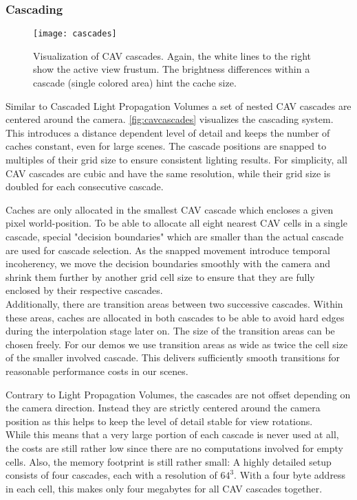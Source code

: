 \documentclass[thesis.tex]{subfiles}
\begin{document}
\subsubsection{Cascading} \label{sec:impl:cavcascading}
\begin{figure}[h]
	\centering
	\texttt{[image: cascades]}
	\caption{Visualization of CAV cascades. Again, the white lines to the right show the active view frustum. The brightness differences within a cascade (single colored area) hint the cache size.} \label{fig:cavcascades}
\end{figure}
Similar to Cascaded Light Propagation Volumes \cite{bib:lpt} a set of nested CAV cascades are centered around the camera.
\autoref{fig:cavcascades} visualizes the cascading system.
This introduces a distance dependent level of detail and keeps the number of caches constant, even for large scenes.
The cascade positions are snapped to multiples of their grid size to ensure consistent lighting results. %
For simplicity, all CAV cascades are cubic and have the same resolution, while their grid size is doubled for each consecutive cascade.

Caches are only allocated in the smallest CAV cascade which encloses a given pixel world-position.
To be able to allocate all eight nearest CAV cells in a single cascade, special "decision boundaries" which are smaller than the actual cascade are used for cascade selection.
As the snapped movement introduce temporal incoherency, we move the decision boundaries smoothly with the camera and shrink them further by another grid cell size to ensure that they are fully enclosed by their respective cascades.
\\
Additionally, there are transition areas between two successive cascades.
Within these areas, caches are allocated in both cascades to be able to avoid hard edges during the interpolation stage later on.
The size of the transition areas can be chosen freely.
For our demos we use transition areas as wide as twice the cell size of the smaller involved cascade.
This delivers sufficiently smooth transitions for reasonable performance costs in our scenes.

Contrary to Light Propagation Volumes, the cascades are not offset depending on the camera direction.
Instead they are strictly centered around the camera position as this helps to keep the level of detail stable for view rotations.\\
While this means that a very large portion of each cascade is never used at all, the costs are still rather low since there are no computations involved for empty cells.
Also, the memory footprint is still rather small: %
A highly detailed setup consists of four cascades, each with a resolution of $64^3$.
With a four byte address in each cell, this makes only four megabytes for all CAV cascades together.
\end{document}
